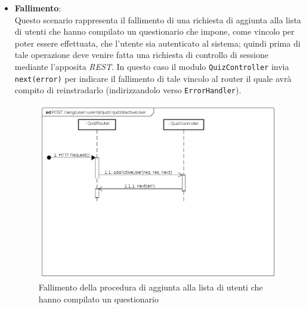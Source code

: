 \begin{itemize}
\item \textbf{Fallimento}:\\
Questo scenario rappresenta il fallimento di una richiesta di aggiunta alla lista di utenti che hanno compilato un questionario che impone, come vincolo per poter essere effettuata, che l'utente sia autenticato al sistema; quindi prima di tale operazione deve venire fatta una richiesta di controllo di sessione mediante l'apposita \textit{REST}. In questo caso il modulo \texttt{QuizController} invia \texttt{next(error)} per indicare il fallimento di tale vincolo al router il quale avrà compito di reinstradarlo (indirizzandolo verso \texttt{ErrorHandler}).
\label{Fallimento della procedura di aggiunta alla lista di utenti che hanno compilato un questionario}
\begin{figure}[ht]
	\centering
	\includegraphics[scale=0.40]{UML/DiagrammiDiSequenza/Back-end/POST__lang_user_userId_quiz_quizId_activeUser_failure.png}
	\caption{Fallimento della procedura di aggiunta alla lista di utenti che hanno compilato un questionario}
\end{figure}
\FloatBarrier
\end{itemize}

